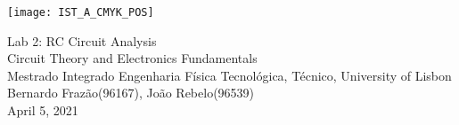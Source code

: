 
\thispagestyle {empty}

\texttt{[image: IST\_A\_CMYK\_POS]}

\begin{center}
%
\vspace{1.0cm}

\vspace{1cm}
{\FontLb Lab 2: RC Circuit Analysis} \\ %
\vspace{1cm}
{\FontSn Circuit Theory and Electronics Fundamentals} \\
\vspace{1cm}
{\FontSn Mestrado Integrado Engenharia Física Tecnológica, Técnico, University of Lisbon} \\ %
\vspace{1cm}
{\FontSn Bernardo Frazão(96167), João Rebelo(96539)} \\
\vspace{1cm}
{\FontSn April 5, 2021} \\ %
%
\end{center}
